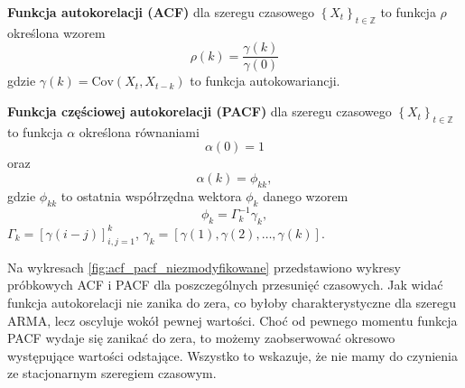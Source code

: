 \documentclass[11pt]{article}
\begin{document}
\begin{definition}
\textbf{Funkcja autokorelacji (ACF)} dla szeregu czasowego ${\left\lbrace X_t \right\rbrace}_{t \in \mathbb{Z}}$ to funkcja $\rho$ określona wzorem 
$$ \rho(k) = \frac{\gamma\left(k\right)}{\gamma\left(0\right)} $$
gdzie $\gamma(k) = \text{Cov}(X_t, X_{t-k})$ to funkcja autokowariancji.
\end{definition}

\begin{definition}
\textbf{Funkcja częściowej autokorelacji (PACF)} dla szeregu czasowego ${\left\lbrace X_t \right\rbrace}_{t \in \mathbb{Z}}$ to funkcja $\alpha$ określona równaniami 
$$ \alpha\left(0\right) = 1$$ 
oraz 
$$ \alpha\left(k\right) = \phi_{kk}, $$
gdzie $\phi_{kk}$ to ostatnia współrzędna wektora $\phi_k$ danego wzorem 
$$ \phi_k = \Gamma_k^{-1}\gamma_k, $$
$ \Gamma_k = \left[\gamma\left(i - j\right)\right]_{i,j = 1}^k $, $\gamma_k = \left[\gamma\left(1\right), \gamma\left(2\right), \ldots, \gamma\left(k\right)\right]$.
\end{definition}

Na wykresach \ref{fig:acf_pacf_niezmodyfikowane} przedstawiono wykresy próbkowych ACF i PACF dla poszczególnych przesunięć czasowych. Jak widać funkcja autokorelacji nie zanika do zera, co byłoby charakterystyczne dla szeregu ARMA, lecz oscyluje wokół pewnej wartości. Choć od pewnego momentu funkcja PACF wydaje się zanikać do zera, to możemy zaobserwować okresowo występujące wartości odstające. Wszystko to wskazuje, że nie mamy do czynienia ze stacjonarnym szeregiem czasowym.
\end{document}

